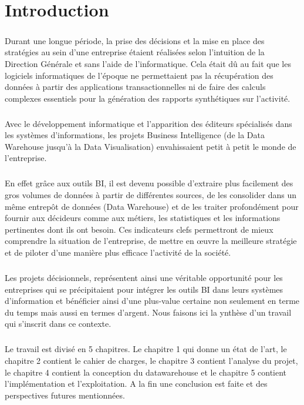 \chapter*{Introduction}

\paragraph{}
Durant une longue période, la prise des décisions et la mise en place des stratégies au sein d’une entreprise étaient réalisées selon l’intuition de la Direction Générale et sans l’aide de l’informatique. Cela était dû au fait que les logiciels informatiques de l’époque ne permettaient pas la récupération des données à partir des applications transactionnelles ni de faire des calculs complexes essentiels pour la génération des rapports synthétiques sur l’activité.
\paragraph{}
Avec le développement informatique et l’apparition des éditeurs spécialisés dans les systèmes d’informations, les projets Business Intelligence (de la Data Warehouse jusqu’à la Data Visualisation) envahissaient petit à petit le monde de l’entreprise.
\paragraph{}
En effet grâce aux outils BI, il est devenu possible d’extraire plus facilement des gros volumes de données à partir de différentes sources, de les consolider dans un même entrepôt de données (Data Warehouse) et de les traiter profondément pour fournir aux décideurs comme aux métiers, les statistiques et les informations pertinentes dont ils ont besoin. Ces indicateurs clefs permettront de mieux comprendre la situation de l’entreprise, de mettre en œuvre la meilleure stratégie et de piloter d’une manière plus efficace l’activité de la société.
\paragraph{}
Les projets décisionnels, représentent ainsi une véritable opportunité pour les entreprises qui se précipitaient pour intégrer les outils BI dans leurs systèmes d’information et bénéficier ainsi d’une plus-value certaine non seulement en terme du temps mais aussi en termes d’argent. Nous faisons ici la ynthèse  d'un travail qui s’inscrit dans ce contexte. 
\paragraph{}
Le travail est divisé en 5 chapitres. Le chapitre 1 qui donne un état de l’art, le chapitre 2 contient le cahier de charges, le chapitre 3 contient l'analyse du projet, le chapitre 4 contient la conception du datawarehouse et le chapitre 5 contient l'implémentation et l'exploitation. A la fin une conclusion est faite et des perspectives futures mentionnées.
